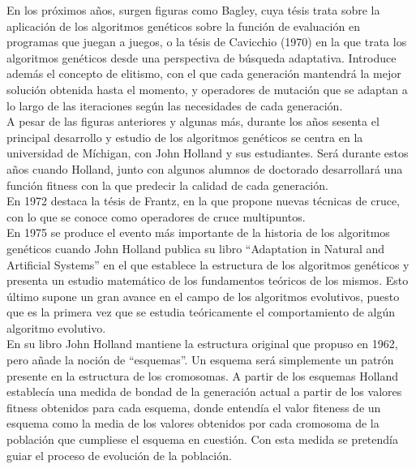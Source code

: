 \documentclass[12pt]{article} \usepackage[utf8x]{inputenc}
\begin{document}
En los próximos años, surgen figuras como Bagley, cuya tésis trata sobre la 
aplicación de los algoritmos genéticos sobre la función de evaluación en 
programas que juegan a juegos, o la tésis de Cavicchio (1970) en la que trata 
los algoritmos genéticos desde una perspectiva de búsqueda adaptativa. 
Introduce además el concepto de elitismo, con el que cada generación mantendrá 
la mejor solución obtenida hasta el momento, y operadores de mutación que se 
adaptan a lo largo de las iteraciones según las necesidades de cada generación.\\

A pesar de las figuras anteriores y algunas más, durante los años sesenta el 
principal desarrollo y estudio de los algoritmos genéticos se centra en la 
universidad de Míchigan, con John Holland y sus estudiantes. Será durante estos 
años cuando Holland, junto con algunos alumnos de doctorado desarrollará una 
función fitness con la que predecir la calidad de cada generación.\\

En 1972 destaca la tésis de Frantz, en la que propone nuevas técnicas de cruce, 
con lo que se conoce como operadores de cruce multipuntos.\\



En 1975 se produce el evento más importante de la historia de los algoritmos 
genéticos cuando John Holland publica su libro ``Adaptation in Natural and 
Artificial Systems'' en el que establece la estructura de los  algoritmos 
genéticos y presenta un estudio matemático de los fundamentos teóricos de los 
mismos. Esto último supone un gran avance en el campo de los algoritmos 
evolutivos, puesto que es la primera vez que se estudia teóricamente el 
comportamiento de algún algoritmo evolutivo.\\


En su libro John Holland mantiene la estructura original que propuso en 1962, 
pero añade la noción de ``esquemas''. Un esquema será simplemente un patrón 
presente en la estructura de los cromosomas. A partir de los esquemas  Holland 
establecía una medida de bondad de la generación actual a partir de los valores 
fitness obtenidos para cada esquema, donde entendía el valor fiteness de un 
esquema como la media de los valores obtenidos por cada cromosoma de la población que 
cumpliese el esquema en cuestión. Con esta medida se pretendía guiar el proceso 
de evolución de la población. \\
\end{document}
